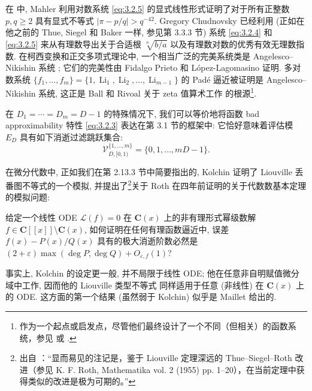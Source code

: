 \begin{remark}
在 \cite{Mil83} 中, Mahler 利用对数系统 \eqref{eq:3.2.5} 的显式线性形式证明了对于所有正整数 \(p, q \ge 2\) 具有显式不等式 \(|\pi - p/q| > q^{-42}\). 
Gregory Chudnovsky \cite{Chu79}\cite{Chu83b}\cite{Chu83a} 已经利用 (正如在他之前的 Thue, Siegel 和 Baker 一样, 参见第 3.3.3 节) 系统 \eqref{eq:3.2.4} 和 \eqref{eq:3.2.5} 来从有理数导出关于合适根 \(\sqrt[n]{b/a}\) 以及有理数对数的优秀有效无理数指数.
在柯西变换和正交多项式理论中, 一个相当广泛的完美系统类是 Angelesco--Nikishin 系统 \cite{Nik80}\cite{Sor96}; 
它们的完美性由 Fidalgo Prieto 和 L{\'o}pez-Lagomasino 证明. 
多对数系统 \(\{f_1, \ldots, f_m\} = \{1, \operatorname{Li}_1, \operatorname{Li}_2, \ldots, \operatorname{Li}_{m-1}\}\) 的 Pad{\'e} 逼近被证明是 Angelesco--Nikishin 系统, 
这正是 Ball 和 Rivoal 关于 zeta 值算术工作 \cite{Riv00}\cite{BR01} 的根源\footnote{作为一个起点或启发点，尽管他们最终设计了一个不同（但相关）的函数系统，参见 \cite[Th{\'e}or{\`e}me 1]{FR03} 或 \cite[§ 2.4]{Fis04}.}.

在 \(D_1 = \cdots = D_m = D - 1\) 的特殊情况下, 我们可以等价地将函数 bad approximability 特性 \eqref{eq:3.2.3} 表达在第 3.1 节的框架中: 
它恰好意味着评估模 \(E_D\) 具有如下消逝过滤跳跃集合:
\begin{equation}\label{eq:3.2.6}
\mathcal{V}_{D,[0,1)}^{\{1,\dots,m\}} = \{0,1,\dots,mD-1\}.
\end{equation}



\end{remark}


在微分代数中, 正如我们在第 2.13.3 节中简要指出的, Kolchin \cite{Kol59} 证明了 Liouville 丢番图不等式的一个模拟, 
并提出了\footnote{出自 \cite{Kol59} ：“显而易见的注记是，鉴于 Liouville 定理深远的 Thue--Siegel--Roth 改进（参见 K. F. Roth, Mathematika vol. 2 (1955) pp. 1--20），在当前定理中获得类似的改进是极为可期的。”}关于 Roth 在四年前证明的关于代数数基本定理的模拟问题:

\begin{question}\label{prob:3.2.7}
给定一个线性 ODE \(\mathcal{L}(f) = 0\) 在 \(\mathbf{C}(x)\) 上的非有理形式幂级数解 \(f \in \mathbf{C}[\![x]\!] \setminus \mathbf{C}(x)\), 
如何证明在任何有理函数逼近中, 误差 \(f(x) - P(x)/Q(x)\) 具有的极大消逝阶数必然是 \((2+\varepsilon) \max(\deg P, \deg Q) + O_{\varepsilon,f}(1)\)?
\end{question}

事实上, Kolchin 的设定更一般, 并不局限于线性 ODE; 他在任意非自明赋值微分域中工作, 
因而他的 Liouville 类型不等式 \cite[§ 5]{Kol59} 同样适用于任意 (非线性) 在 \(\mathbf{C}(x)\) 上的 ODE. 
这方面的第一个结果 (虽然弱于 Kolchin) 似乎是 Maillet 给出的.

